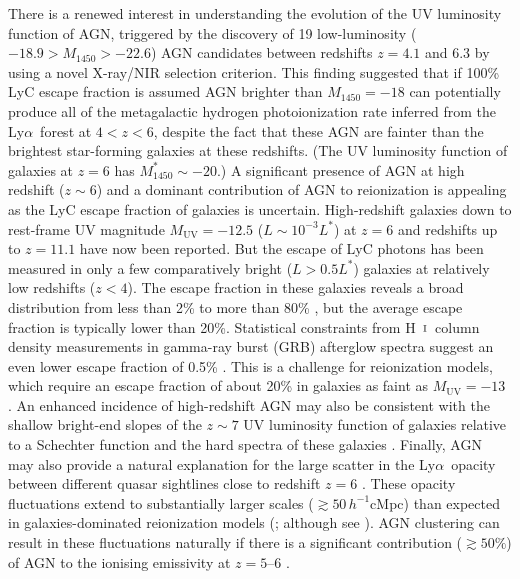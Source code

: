 \documentclass[fleqn,usenatbib]{mnras}
\def\lya{Ly$\alpha$~}
\def\HI{\hbox{H~$\scriptstyle\rm I$}}
\begin{document}
There is a renewed interest in understanding the evolution of the UV
luminosity function of AGN, triggered by the discovery of 19
low-luminosity ($-18.9>M_{1450}>-22.6$) AGN candidates between
redshifts $z=4.1$ and $6.3$ by \citet{2015AA...578A..83G} using a
novel X-ray/NIR selection criterion.  This finding suggested that if
100\% LyC escape fraction is assumed AGN brighter than $M_{1450}=-18$
can potentially produce all of the metagalactic hydrogen
photoionization rate inferred from the \lya forest at $4<z<6$, despite
the fact that these AGN are fainter than the brightest star-forming
galaxies at these redshifts.  (The UV luminosity function of galaxies
at $z=6$ has $M^*_{1450}\sim -20$.)  A significant presence of AGN at
high redshift ($z\sim 6$) and a dominant contribution of AGN to
reionization is appealing as the LyC escape fraction of galaxies is
uncertain.  High-redshift galaxies down to rest-frame UV magnitude
$M_\mathrm{UV}=-12.5$ ($L\sim 10^{-3}L^*$) at $z=6$
\citep{2017ApJ...835..113L} and redshifts up to $z=11.1$
\citep{2016ApJ...819..129O} have now been reported.  But the escape of
LyC photons has been measured in only a few comparatively bright
($L>0.5L^*$) galaxies at relatively low redshifts ($z < 4$).  The
escape fraction in these galaxies reveals a broad distribution from
less than 2\% to more than 80\% \citep{2010ApJ...725.1011V,
  2011ApJ...736...41B, 2015ApJ...804...17S, 2015ApJ...810..107M,
  2016A&A...585A..48G, 2017MNRAS.468..389J, 2018arXiv180506071S,
  2018arXiv180601741F, 2018arXiv180511621M, 2018arXiv180303655C}, but
the average escape fraction is typically lower than 20\%.  Statistical
constraints from \HI\ column density measurements in gamma-ray burst
(GRB) afterglow spectra suggest an even lower escape fraction of 0.5\%
\citep{2007ApJ...667L.125C, 2009ApJS..185..526F, 2018arXiv180507318T}.
This is a challenge for reionization models, which require an escape
fraction of about 20\% in galaxies as faint as $M_\mathrm{UV}=-13$
\citep{2016PASA...33...37F, 2015ApJ...802L..19R, 2016MNRAS.457.4051K}.
An enhanced incidence of high-redshift AGN may also be consistent with
the shallow bright-end slopes of the $z\sim 7$ UV luminosity function
of galaxies relative to a Schechter function
\citep{2012MNRAS.426.2772B, 2014MNRAS.440.2810B, 2014ApJ...792...76B,
  2015MNRAS.452.1817B} and the hard spectra of these galaxies
\citep{2015MNRAS.450.1846S, 2015MNRAS.454.1393S, 2017MNRAS.464..469S}.
Finally, AGN may also provide a natural explanation for the large
scatter in the \lya opacity between different quasar sightlines close
to redshift $z=6$ \citep{2015MNRAS.447.3402B, 2018arXiv180208177B}.
These opacity fluctuations extend to substantially larger scales
($\gtrsim 50\, h^{-1}$cMpc) than expected in galaxies-dominated
reionization models (\citealt{2015MNRAS.453.2943C}; although see
\citealt{2016MNRAS.460.1328D, 2015ApJ...813L..38D,
  2018arXiv180308932B}).  AGN clustering can result in these
fluctuations naturally if there is a significant contribution
($\gtrsim 50\%$) of AGN to the ionising emissivity at $z=5$--$6$
\citep{2017MNRAS.465.3429C}.
\end{document}
